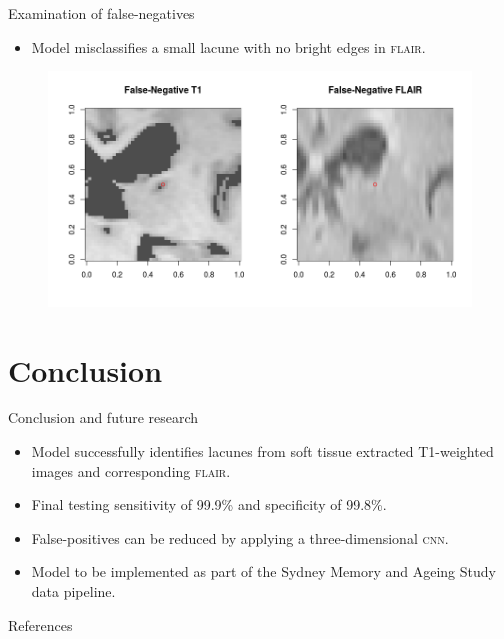\documentclass{beamer}
\begin{document}
\begin{frame}{Examination of false-negatives}
\begin{itemize}
\item Model misclassifies a small lacune with no bright edges in \textsc{flair}.
\end{itemize}
\begin{figure}
\centering
\includegraphics[width=\linewidth]{../Thesis_Docs/Images/7_FN_t1_flair.png}
\end{figure}
\end{frame}


\section{Conclusion}

\begin{frame}{Conclusion and future research}
\begin{itemize}
\item Model successfully identifies lacunes from soft tissue extracted T1-weighted images and corresponding \textsc{flair}.
\item Final testing sensitivity of 99.9\% and specificity of 99.8\%.
\item False-positives can be reduced by applying a three-dimensional \textsc{cnn}.
\item Model to be implemented as part of the Sydney Memory and Ageing Study data pipeline.
\end{itemize}

\end{frame}


\begin{frame}[allowframebreaks]{References}
	
	
\end{frame}
\end{document}

